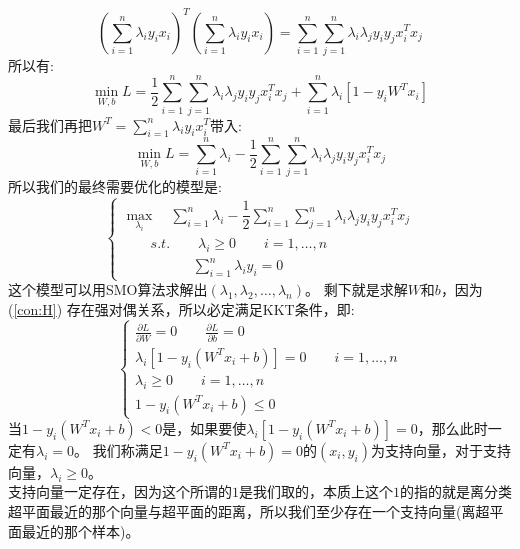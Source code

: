\documentclass[withoutpreface,bwprint]{cumcmthesis} %
\begin{document}
	\begin{equation}
		(\sum_{i=1}^{n}\lambda_i y_i x_i)^T (\sum_{i=1}^{n}\lambda_i y_i x_i)=\sum_{i=1}^{n}\sum_{j=1}^{n}\lambda_i \lambda_j y_i y_j x_i^T x_j
	\end{equation}
	所以有:
	\begin{equation}
			\mathop{min} \limits_{W,b} L=\dfrac{1}{2} \sum_{i=1}^{n}\sum_{j=1}^{n}\lambda_i \lambda_j y_i y_j x_i^T x_j+\sum_{i=1}^{n}\lambda_i \left[1-y_iW^Tx_i  \right]
	\end{equation}
	最后我们再把$W^T=\sum_{i=1}^{n}\lambda_iy_ix_i^T$带入:
	\begin{equation}
			\mathop{min} \limits_{W,b} L=\sum_{i=1}^{n}\lambda_i -\dfrac{1}{2} \sum_{i=1}^{n}\sum_{j=1}^{n} \lambda_i \lambda_j y_i y_j x_i^T x_j
	\end{equation}
	所以我们的最终需要优化的模型是:
	\begin{equation}
		\begin{cases}
				\mathop{max} \limits_{\lambda_i} \quad \sum_{i=1}^{n}\lambda_i -\dfrac{1}{2} \sum_{i=1}^{n}\sum_{j=1}^{n} \lambda_i \lambda_j y_i y_j x_i^T x_j
				\\
				\quad \quad s.t.\quad \quad \lambda_i \geq 0 \quad \quad i=1,\ldots,n \\
				\quad \quad \quad \quad \quad \sum_{i=1}^{n} \lambda_i y_i=0
		\end{cases}
	\end{equation}
	这个模型可以用SMO算法求解出$(\lambda_1,\lambda_2,\ldots,\lambda_n)$。
	剩下就是求解$W$和$b$，因为(\ref {con:H}) 存在强对偶关系，所以必定满足KKT条件，即:
	\begin{equation}
		\begin{cases}
			\frac{\partial L}{\partial W}=0 \quad \quad \frac{\partial L}{\partial b}=0\\
			\lambda_i\left[1-y_i(W^Tx_i+b)\right]=0 \quad \quad i=1,\ldots,n \\
			\lambda_i \geq 0 \quad \quad i=1,\ldots,n \\
			1-y_i(W^Tx_i+b) \leq 0
		\end{cases}
	\end{equation}
	当$1-y_i(W^Tx_i+b) < 0$是，如果要使$\lambda_i\left[1-y_i(W^Tx_i+b)\right]=0$，那么此时一定有$\lambda_i=0$。
	我们称满足$1-y_i(W^Tx_i+b)=0$的$(x_i,y_i)$为支持向量，对于支持向量，$\lambda_i \geq 0$。\\
	支持向量一定存在，因为这个所谓的$1$是我们取的，本质上这个$1$的指的就是离分类超平面最近的那个向量与超平面的距离，所以我们至少存在一个支持向量(离超平面最近的那个样本)。\\
\end{document}
